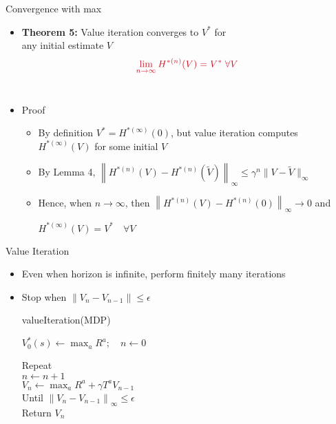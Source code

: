 \documentclass[11pt,table]{beamer}
\begin{document}
\begin{frame}{Convergence with max}


\begin{itemize}
    \item \textbf{Theorem 5:} \textcolor{red1}{Value iteration converges to $V^{*}$} for\\ any initial estimate $V$
$$
\textcolor{red1}{\lim _{n \rightarrow \infty} H^{*(n)}(V)=V^{*} \; \forall V}
$$\\

\pause

\item Proof

\begin{itemize}
\item By definition $V^{*}=H^{*(\infty)}(0)$, but value iteration computes $H^{*(\infty)}(V)$ for some initial $V$\\[2ex]
\item By Lemma 4, $\left\|H^{*(n)}(V)-H^{*(n)}(\tilde{V})\right\|_{\infty} \leq \gamma^{n}\|V-\tilde{V}\|_{\infty}$\\[2ex]
\item Hence, when $n \rightarrow \infty$, then $\left\|H^{*(n)}(V)-H^{*(n)}(0)\right\|_{\infty} \rightarrow 0$ and

$
H^{*(\infty)}(V)=V^{*} \quad\forall V
$ 
\end{itemize}
  \end{itemize}  
\end{frame}

\begin{frame}{Value Iteration}
    \begin{itemize}
        \item Even when horizon is infinite, perform finitely many iterations

\item \textcolor{red1}{Stop when $\left\|V_{n}-V_{n-1}\right\| \leq \epsilon$}



    
\begin{tcolorbox}[colframe=black, boxrule=1pt, sharp corners]

\textcolor{red1}{valueIteration(MDP)} 

$V_{0}^{*}(s) \leftarrow \max _{a} R^{a} ; \quad n \leftarrow 0$

Repeat\\
\hspace*{5mm} $n \leftarrow n+1 $\\
\hspace*{5mm} $V_{n} \leftarrow \max _{a} R^{a}+\gamma T^{a} V_{n-1}$\\
Until $\left\|V_{n}-V_{n-1}\right\|_{\infty} \leq \epsilon$\\
Return $V_{n}$ 

\end{tcolorbox}
    \end{itemize}
\end{frame}
\end{document}
